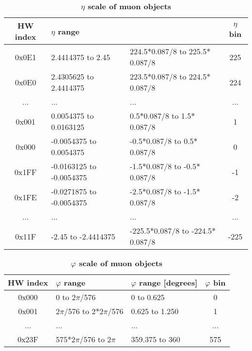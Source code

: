 \documentclass{cmspaper}
\begin{document}
\begin{table}[htdp]
\caption{\bf $\eta$ scale of muon objects}
\begin{center}
\begin{tabular}{|c|l|l|c|}\hline
HW index & $\eta$ range &  & $\eta$ bin\\\hline\hline
0x0E1 & 2.4414375 to 2.45 & 224.5$*$0.087/8 to 225.5$*$0.087/8 & 225\\\hline
0x0E0 & 2.4305625 to 2.4414375 & 223.5$*$0.087/8 to 224.5$*$0.087/8 & 224\\\hline
... & ... & ... & ...\\\hline
0x001 & 0.0054375 to 0.0163125 & 0.5$*$0.087/8 to 1.5$*$0.087/8 & 1\\\hline
0x000 & -0.0054375 to 0.0054375 & -0.5$*$0.087/8 to 0.5$*$0.087/8 & 0\\\hline
0x1FF & -0.0163125 to -0.0054375 & -1.5$*$0.087/8 to -0.5$*$0.087/8 & -1\\\hline
0x1FE & -0.0271875 to -0.0054375 & -2.5$*$0.087/8 to -1.5$*$0.087/8 & -2\\\hline
... & ... & ... & ...\\\hline
0x11F & -2.45 to -2.4414375 & -225.5$*$0.087/8 to -224.5$*$0.087/8 & -225\\\hline
\end{tabular}
\end{center}
\label{table:muon_eta_scale}
\end{table}

\begin{table}[htdp]
\caption{\bf $\varphi$ scale of muon objects}
\begin{center}
\begin{tabular}{|c|l|l|c|}\hline
HW index & $\varphi$ range & $\varphi$ range [degrees] & $\varphi$ bin\\\hline\hline
0x000 & 0 to 2$\pi$/576 & 0 to 0.625 & 0\\\hline
0x001 & 2$\pi$/576 to 2$*$2$\pi$/576 & 0.625 to 1.250 & 1\\\hline
... & ... & ... & ...\\\hline
0x23F & 575$*$2$\pi$/576 to 2$\pi$ & 359.375 to 360 & 575\\\hline
\end{tabular}
\end{center}
\label{table:muon_phi_scale}
\end{table}
\end{document}

